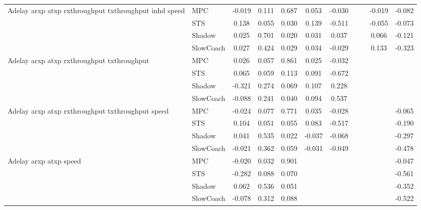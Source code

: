 \begin{tabular}{|l|l|*{9}{c|}}
\midrule
Adelay arxp atxp rxthroughput txthroughput inhd speed    & MPC &   -0.019 &     0.111 &     0.687 &  0.053 & -0.030 &     &      &  -0.019 &   -0.082 \\
                              & STS &    0.138 &     0.055 &     0.030 &  0.139 & -0.511 &     &      &  -0.055 &   -0.073 \\
                              & Shadow &    0.025 &     0.701 &     0.020 &  0.031 &  0.037 &     &      &   0.066 &   -0.121 \\
                              & SlowCoach &    0.027 &     0.424 &     0.029 &  0.034 & -0.029 &     &      &   0.133 &   -0.323 \\
\midrule
Adelay arxp atxp rxthroughput txthroughput    & MPC &    0.026 &     0.057 &     0.861 &  0.025 & -0.032 &     &      &      &       \\
                              & STS &    0.065 &     0.059 &     0.113 &  0.091 & -0.672 &     &      &      &       \\
                              & Shadow &   -0.321 &     0.274 &     0.069 &  0.107 &  0.228 &     &      &      &       \\
                              & SlowCoach &   -0.088 &     0.241 &     0.040 &  0.094 &  0.537 &     &      &      &       \\
\midrule
Adelay arxp atxp rxthroughput txthroughput speed    & MPC &   -0.024 &     0.077 &     0.771 &  0.035 & -0.028 &     &      &      &   -0.065 \\
                              & STS &    0.104 &     0.051 &     0.055 &  0.083 & -0.517 &     &      &      &   -0.190 \\
                              & Shadow &    0.041 &     0.535 &     0.022 & -0.037 & -0.068 &     &      &      &   -0.297 \\
                              & SlowCoach &   -0.021 &     0.362 &     0.059 & -0.031 & -0.049 &     &      &      &   -0.478 \\
\midrule
Adelay arxp atxp speed    & MPC &   -0.020 &     0.032 &     0.901 &     &     &     &      &      &   -0.047 \\
                              & STS &   -0.282 &     0.088 &     0.070 &     &     &     &      &      &   -0.561 \\
                              & Shadow &    0.062 &     0.536 &     0.051 &     &     &     &      &      &   -0.352 \\
                              & SlowCoach &   -0.078 &     0.312 &     0.088 &     &     &     &      &      &   -0.522 \\

\end{tabular}
